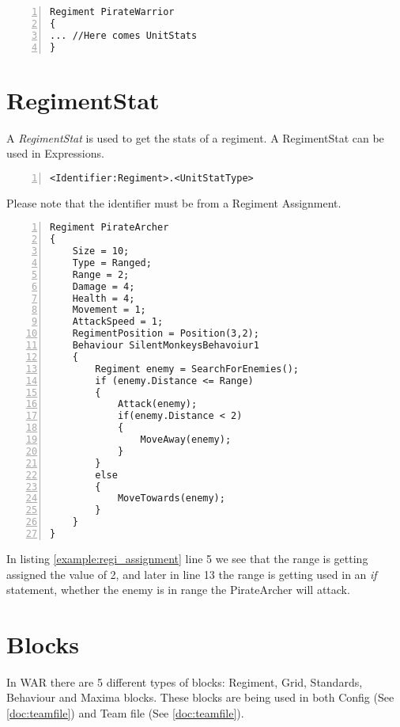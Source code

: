 		\begin{lstlisting}[basicstyle=\small\sffamily, keywordstyle={\color{blue}}, comment={[l]{//}}, morecomment={[s]{/*}{*/}}, commentstyle=\itshape, columns={[l]flexible}, numbers=left, numberstyle=\tiny, frameround=fftt, frame=shadowbox, captionpos=b,
		caption={Example of a regiment assignment}]
Regiment PirateWarrior
{
... //Here comes UnitStats
}
		\end{lstlisting}
		

\section{RegimentStat}
	A {\it RegimentStat} is used to get the stats of a regiment. A RegimentStat can be used in Expressions.\\

		\begin{lstlisting}[basicstyle=\small\sffamily,
		keywordstyle={\color{blue}},
		comment={[l]{//}}, morecomment={[s]{/*}{*/}}, commentstyle=\itshape,
		columns={[l]flexible}, numbers=left, numberstyle=\tiny,
		frameround=fftt, frame=shadowbox, captionpos=b,
		caption={Regiment Stat}]
<Identifier:Regiment>.<UnitStatType>
	\end{lstlisting}
	Please note that the identifier must be from a Regiment Assignment.

		\begin{lstlisting}[basicstyle=\small\sffamily,
		keywordstyle={\color{blue}},
		comment={[l]{//}}, morecomment={[s]{/*}{*/}}, commentstyle=\itshape,
		columns={[l]flexible}, numbers=left, numberstyle=\tiny,
		frameround=fftt, frame=shadowbox, captionpos=b,
		caption={Example of an assignment in use},
		label={example:regi_assignment}]
Regiment PirateArcher
{
	Size = 10;
	Type = Ranged;
	Range = 2;
	Damage = 4;
	Health = 4;
	Movement = 1;
	AttackSpeed = 1;
	RegimentPosition = Position(3,2);
	Behaviour SilentMonkeysBehavoiur1
	{
		Regiment enemy = SearchForEnemies();
		if (enemy.Distance <= Range)
		{
			Attack(enemy);
			if(enemy.Distance < 2)
			{
				MoveAway(enemy);
			}
		}
		else
		{
			MoveTowards(enemy);
		}
	}
}
\end{lstlisting}
In listing \ref{example:regi_assignment} line 5 we see that the range is getting assigned the value of 2, and later in line 13 the range is getting used in an \textit{if} statement, whether the enemy is in range the PirateArcher will attack.

\section{Blocks}
\label{doc:blocks}
	In WAR there are 5 different types of blocks: Regiment, Grid, Standards, Behaviour and Maxima blocks. 
	These blocks are being used in both Config (See \ref{doc:teamfile}) and Team file (See \ref{doc:teamfile}).
